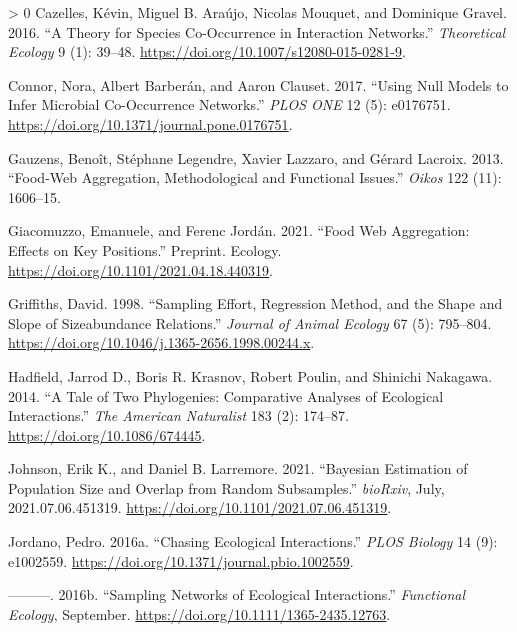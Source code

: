 \documentclass[11pt]{article}
\newlength{\cslhangindent}
\newenvironment{CSLReferences}[3] %
 {%
  \setlength{\parindent}{0pt}
  \ifodd #1 \everypar{\setlength{\hangindent}{\cslhangindent}}\ignorespaces\fi
  \ifnum #2 > 0
  \setlength{\parskip}{#2\baselineskip}
  \fi
 }%
 {}
\begin{document}
\begin{CSLReferences}{1}{0}
\leavevmode\hypertarget{ref-Cazelles2016TheSpe}{}%
Cazelles, Kévin, Miguel B. Araújo, Nicolas Mouquet, and Dominique
Gravel. 2016. {``A Theory for Species Co-Occurrence in Interaction
Networks.''} \emph{Theoretical Ecology} 9 (1): 39--48.
\url{https://doi.org/10.1007/s12080-015-0281-9}.

\leavevmode\hypertarget{ref-Connor2017UsiNul}{}%
Connor, Nora, Albert Barberán, and Aaron Clauset. 2017. {``Using Null
Models to Infer Microbial Co-Occurrence Networks.''} \emph{PLOS ONE} 12
(5): e0176751. \url{https://doi.org/10.1371/journal.pone.0176751}.

\leavevmode\hypertarget{ref-Gauzens2013FooAgg}{}%
Gauzens, Benoît, Stéphane Legendre, Xavier Lazzaro, and Gérard Lacroix.
2013. {``Food-Web Aggregation, Methodological and Functional Issues.''}
\emph{Oikos} 122 (11): 1606--15.

\leavevmode\hypertarget{ref-Giacomuzzo2021FooWeb}{}%
Giacomuzzo, Emanuele, and Ferenc Jordán. 2021. {``Food Web Aggregation:
Effects on Key Positions.''} Preprint. Ecology.
\url{https://doi.org/10.1101/2021.04.18.440319}.

\leavevmode\hypertarget{ref-Griffiths1998SamEff}{}%
Griffiths, David. 1998. {``Sampling Effort, Regression Method, and the
Shape and Slope of Sizeabundance Relations.''} \emph{Journal of Animal
Ecology} 67 (5): 795--804.
\url{https://doi.org/10.1046/j.1365-2656.1998.00244.x}.

\leavevmode\hypertarget{ref-Hadfield2014TalTwo}{}%
Hadfield, Jarrod D., Boris R. Krasnov, Robert Poulin, and Shinichi
Nakagawa. 2014. {``A Tale of Two Phylogenies: Comparative Analyses of
Ecological Interactions.''} \emph{The American Naturalist} 183 (2):
174--87. \url{https://doi.org/10.1086/674445}.

\leavevmode\hypertarget{ref-Johnson2021BayEst}{}%
Johnson, Erik K., and Daniel B. Larremore. 2021. {``Bayesian Estimation
of Population Size and Overlap from Random Subsamples.''}
\emph{bioRxiv}, July, 2021.07.06.451319.
\url{https://doi.org/10.1101/2021.07.06.451319}.

\leavevmode\hypertarget{ref-Jordano2016ChaEco}{}%
Jordano, Pedro. 2016a. {``Chasing Ecological Interactions.''} \emph{PLOS
Biology} 14 (9): e1002559.
\url{https://doi.org/10.1371/journal.pbio.1002559}.

\leavevmode\hypertarget{ref-Jordano2016SamNet}{}%
---------. 2016b. {``Sampling Networks of Ecological Interactions.''}
\emph{Functional Ecology}, September.
\url{https://doi.org/10.1111/1365-2435.12763}.


\end{CSLReferences}
\end{document}
